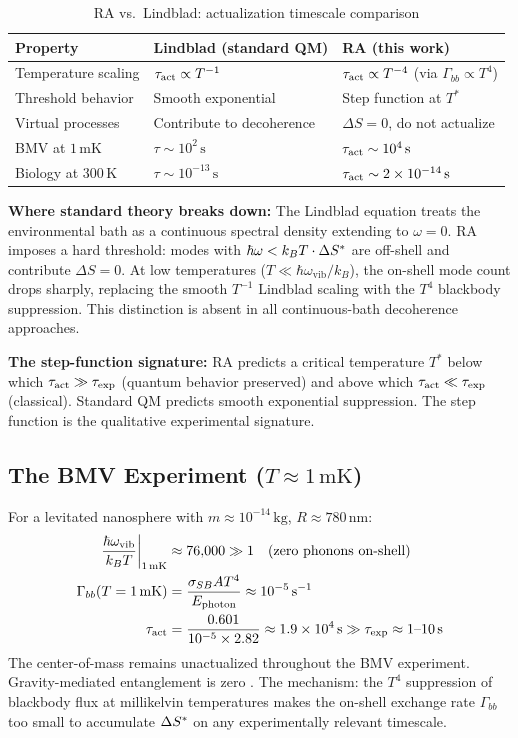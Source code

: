 \documentclass[12pt,a4paper]{article}
\begin{document}
\begin{table}[h]
\centering
\caption{RA vs.\ Lindblad: actualization timescale comparison}
\label{tab:comparison}
\begin{tabular}{lll}
\toprule
Property & Lindblad (standard QM) & RA (this work) \\
\midrule
Temperature scaling & $\tau_{\mathrm{act}} \propto T^{-1}$ & $\tau_{\mathrm{act}} \propto T^{-4}$ (via $\Gamma_{bb}\propto T^4$) \\
Threshold behavior & Smooth exponential & Step function at $T^*$ \\
Virtual processes & Contribute to decoherence & $\Delta S=0$, do not actualize \\
BMV at $1\,\mathrm{mK}$ & $\tau \sim 10^2\,\mathrm{s}$ & $\tau_{\mathrm{act}} \sim 10^4\,\mathrm{s}$ \\
Biology at $300\,\mathrm{K}$ & $\tau \sim 10^{-13}\,\mathrm{s}$ & $\tau_{\mathrm{act}} \sim 2\times10^{-14}\,\mathrm{s}$ \\
\bottomrule
\end{tabular}
\end{table}

\textbf{Where standard theory breaks down:} The Lindblad equation treats the environmental bath as a continuous spectral density extending to $\omega=0$.  RA imposes a hard threshold: modes with $\hbar\omega < k_BT\cdot\Delta S^*$ are off-shell and contribute $\Delta S=0$.  At low temperatures ($T\ll \hbar\omega_{\mathrm{vib}}/k_B$), the on-shell mode count drops sharply, replacing the smooth $T^{-1}$ Lindblad scaling with the $T^4$ blackbody suppression.  This distinction is absent in all continuous-bath decoherence approaches.

\textbf{The step-function signature:} RA predicts a critical temperature $T^*$ below which $\tau_{\mathrm{act}} \gg \tau_{\mathrm{exp}}$ (quantum behavior preserved) and above which $\tau_{\mathrm{act}} \ll \tau_{\mathrm{exp}}$ (classical).  Standard QM predicts smooth exponential suppression.  The step function is the qualitative experimental signature.

\subsection{The BMV Experiment ($T\approx 1\,\mathrm{mK}$)}

For a levitated nanosphere with $m \approx 10^{-14}\,\mathrm{kg}$, $R \approx 780\,\mathrm{nm}$:
\begin{align}
  \frac{\hbar\omega_{\mathrm{vib}}}{k_BT}\biggr|_{1\,\mathrm{mK}} &\approx 76{,}000 \gg 1 \quad\text{(zero phonons on-shell)} \\
  \Gamma_{bb}(T=1\,\mathrm{mK}) &= \frac{\sigma_{SB} A T^4}{E_{\mathrm{photon}}} \approx 10^{-5}\,\mathrm{s}^{-1} \\
  \tau_{\mathrm{act}} &= \frac{0.601}{10^{-5}\times 2.82} \approx 1.9\times 10^4\,\mathrm{s} \gg \tau_{\mathrm{exp}} \approx 1\text{--}10\,\mathrm{s}
  \label{eq:bmv}
\end{align}
The center-of-mass remains unactualized throughout the BMV experiment.  Gravity-mediated entanglement is zero \statusDR.  The mechanism: the $T^4$ suppression of blackbody flux at millikelvin temperatures makes the on-shell exchange rate $\Gamma_{bb}$ too small to accumulate $\Delta S^*$ on any experimentally relevant timescale.
\end{document}
